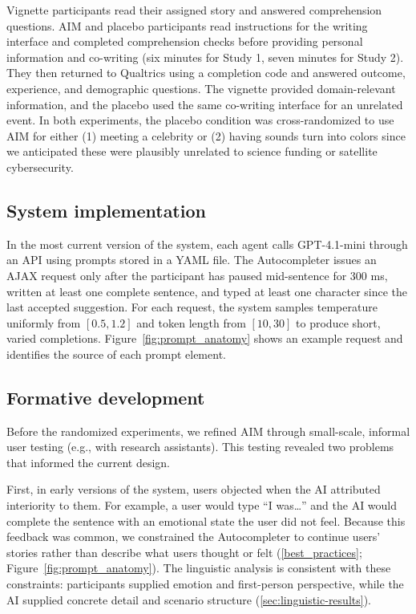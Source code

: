 \documentclass[11pt]{article}
\begin{document}
Vignette participants read their assigned story and answered comprehension questions. AIM and placebo participants read instructions for the writing interface and completed comprehension checks before providing personal information and co-writing (six minutes for Study 1, seven minutes for Study 2). They then returned to Qualtrics using a completion code and answered outcome, experience, and demographic questions.  The vignette provided domain-relevant information, and the placebo used the same co-writing interface for an unrelated event.  In both experiments, the placebo condition was cross-randomized to use AIM for either (1) meeting a celebrity or (2) having sounds turn into colors since we anticipated these were plausibly unrelated to science funding or satellite cybersecurity.

\subsection{System implementation}
\label{sec:methods-system-implementation}

In the most current version of the system, each agent calls GPT-4.1-mini through an API using prompts stored in a YAML file. The Autocompleter issues an AJAX request only after the participant has paused mid-sentence for 300 ms, written at least one complete sentence, and typed at least one character since the last accepted suggestion. For each request, the system samples temperature uniformly from $[0.5, 1.2]$ and token length from $[10, 30]$ to produce short, varied completions. Figure~\ref{fig:prompt_anatomy} shows an example request and identifies the source of each prompt element.

\subsection{Formative development}
\label{sec:methods-formative-development}

Before the randomized experiments, we refined AIM through small-scale, informal user testing (e.g., with research assistants). This testing revealed two problems that informed the current design.

First, in early versions of the system, users objected when the AI attributed interiority to them. For example, a user would type ``I was\ldots'' and the AI would complete the sentence with an emotional state the user did not feel. Because this feedback was common, we constrained the Autocompleter to continue users' stories rather than describe what users thought or felt (\autoref{best_practices}; Figure~\ref{fig:prompt_anatomy}). The linguistic analysis is consistent with these constraints: participants supplied emotion and first-person perspective, while the AI supplied concrete detail and scenario structure (\autoref{sec:linguistic-results}).
\end{document}
